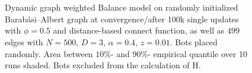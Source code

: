 \documentclass[11pt]{article}
\begin{document}
\begin{figure}[!htb]
\begin{center}
\\[-2.3ex]
\\[-2.3ex]


\end{center}
\caption{
Dynamic graph weighted Balance model on randomly initialized Barabási–Albert graph at convergence/after 100k single updates with $\phi=0.5$ and distance-based connect function, as well as $499$ edges with $N=500$, $D=3$, $\alpha=0.4$, $z=0.01$. Bots placed randomly. Area between $10\%$- and $90\%$- empirical quantile over 10 runs shaded. Bots excluded from the calculation of H.
}
\label{bots dynamic_vareps}
\end{figure}
\end{document}
